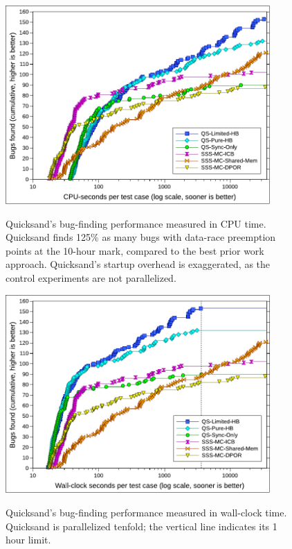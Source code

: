 \begin{figure}[h]
	\begin{center}
        \includegraphics[width=0.9\textwidth]{../proposal/dowefindbugsfaster-v2.pdf} \\
	\end{center}
	\caption[Quicksand's bug-finding performance measured in CPU time.]
		{Quicksand's bug-finding performance measured in CPU time.
		Quicksand finds 125\% as many bugs with data-race preemption points at the 10-hour mark,
		compared to the best prior work approach.
		Quicksand's startup overhead is exaggerated, as the control experiments are not parallelized.}
        \label{fig:dowefindbugsfaster-cpu}
\end{figure}
\begin{figure}[h]
	\begin{center}
        \includegraphics[width=0.9\textwidth]{../proposal/dowefindbugsfaster-wallclock-v2.pdf} \\
	\end{center}
	\caption[Quicksand's bug-finding performance measured in wall-clock time.]
		{Quicksand's bug-finding performance measured in wall-clock time.
		Quicksand is parallelized tenfold; the vertical line indicates its 1 hour limit.}
        \label{fig:dowefindbugsfaster-wall}
\end{figure}

